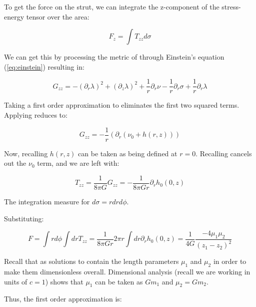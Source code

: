 \documentclass{article}
\begin{document}
To get the force on the strut, we can integrate the z-component of the stress-energy tensor over the area:

\begin{equation}
	\label{eq:F_z}
	F_{z}=\int T_{zz}d\sigma
\end{equation}

We can get this by processing the metric of  through Einstein's equation (\ref{eq:einstein}) resulting in:

\begin{equation}
\label{eq:G_zz}
G_{zz}=-\left(\partial_{r}\lambda\right)^{2}+\left(\partial_{z}\lambda\right)^{2}+\frac{1}{r}\partial_{r}\nu -\frac{1}{r}\partial_{r}\sigma +\frac{1}{r}\partial_{r}\lambda 
\end{equation}

Taking a first order approximation to  eliminates the first two squared terms. Applying  reduces to:

\begin{equation}
\label{eq:G_zz_reduced}
G_{zz}=-\frac{1}{r}\left(\partial_{r}\left(\nu_0+h(r,z)\right)\right) 
\end{equation}

Now, recalling  $h(r,z)$ can be taken as being defined at $r=0$. Recalling  cancels out the $\nu_0$ term, and we are left with:

\begin{equation}
\label{eq:T_zz}
T_{zz}=\frac{1}{8\pi G}G_{zz}=-\frac{1}{8\pi Gr}\partial_{r}h_0(0,z)
\end{equation}

The integration measure for  $d\sigma=rdrd\phi$.

Substituting:

\begin{equation}
F=\int rd\phi\int dr T_{zz}=\frac{1}{8\pi Gr}2\pi r\int dr\partial_{r}h_0(0,z)=\frac{1}{4G}\frac{-4\mu_1\mu_2}{\left(z_1-z_2\right)^2}
\end{equation}

Recall that  as solutions to  contain the length parameters $\mu_1$ and $\mu_2$ in order to make them dimensionless overall. Dimensional analysis (recall we are working in units of $c=1$) shows that $\mu_1$ can be taken as $Gm_{1}$ and $\mu_2=Gm_2$.

Thus, the first order approximation is:
\end{document}
